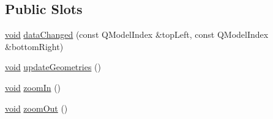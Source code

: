 \subsection*{Public Slots}
\begin{DoxyCompactItemize}
\item 
\hyperlink{group___u_a_v_objects_plugin_ga444cf2ff3f0ecbe028adce838d373f5c}{void} \hyperlink{class_qxt_schedule_view_a71d1a84581afb3099857bb640adc1c6a}{data\-Changed} (const Q\-Model\-Index \&top\-Left, const Q\-Model\-Index \&bottom\-Right)
\item 
\hyperlink{group___u_a_v_objects_plugin_ga444cf2ff3f0ecbe028adce838d373f5c}{void} \hyperlink{class_qxt_schedule_view_ab4a041167277ea9e2697df1534b243e9}{update\-Geometries} ()
\item 
\hyperlink{group___u_a_v_objects_plugin_ga444cf2ff3f0ecbe028adce838d373f5c}{void} \hyperlink{class_qxt_schedule_view_af649c3b890527e362c3c3fa0fd986f48}{zoom\-In} ()
\item 
\hyperlink{group___u_a_v_objects_plugin_ga444cf2ff3f0ecbe028adce838d373f5c}{void} \hyperlink{class_qxt_schedule_view_a0c37abd1da27d410d1b53e0425cdb603}{zoom\-Out} ()
\end{DoxyCompactItemize}
